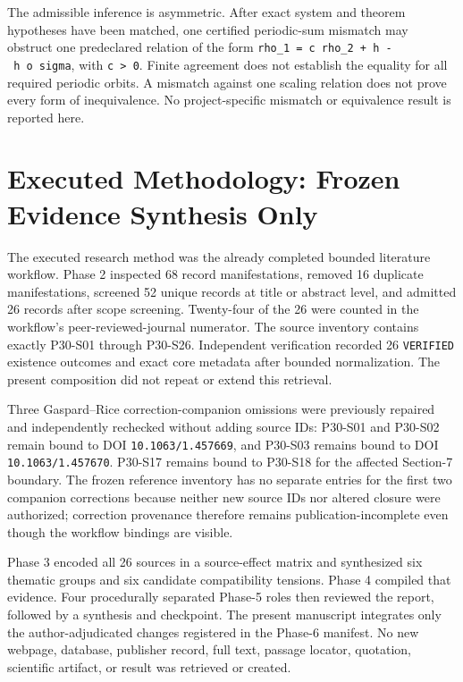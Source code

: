 \documentclass[11pt,a4paper]{article}
\begin{document}
The admissible inference is asymmetric. After exact system and theorem hypotheses have been matched, one certified periodic-sum mismatch may obstruct one predeclared relation of the form \texttt{rho\_1\ =\ c\ rho\_2\ +\ h\ -\ h\ o\ sigma}, with \texttt{c\ \textgreater{}\ 0}. Finite agreement does not establish the equality for all required periodic orbits. A mismatch against one scaling relation does not prove every form of inequivalence. No project-specific mismatch or equivalence result is reported here.

\section{Executed Methodology: Frozen Evidence Synthesis Only}

The executed research method was the already completed bounded literature workflow. Phase 2 inspected 68 record manifestations, removed 16 duplicate manifestations, screened 52 unique records at title or abstract level, and admitted 26 records after scope screening. Twenty-four of the 26 were counted in the workflow's peer-reviewed-journal numerator. The source inventory contains exactly P30-S01 through P30-S26. Independent verification recorded 26 \texttt{VERIFIED} existence outcomes and exact core metadata after bounded normalization. The present composition did not repeat or extend this retrieval.

Three Gaspard--Rice correction-companion omissions were previously repaired and independently rechecked without adding source IDs: P30-S01 and P30-S02 remain bound to DOI \texttt{10.1063/1.457669}, and P30-S03 remains bound to DOI \texttt{10.1063/1.457670}. P30-S17 remains bound to P30-S18 for the affected Section-7 boundary. The frozen reference inventory has no separate entries for the first two companion corrections because neither new source IDs nor altered closure were authorized; correction provenance therefore remains publication-incomplete even though the workflow bindings are visible.

Phase 3 encoded all 26 sources in a source-effect matrix and synthesized six thematic groups and six candidate compatibility tensions. Phase 4 compiled that evidence. Four procedurally separated Phase-5 roles then reviewed the report, followed by a synthesis and checkpoint. The present manuscript integrates only the author-adjudicated changes registered in the Phase-6 manifest. No new webpage, database, publisher record, full text, passage locator, quotation, scientific artifact, or result was retrieved or created.
\end{document}
